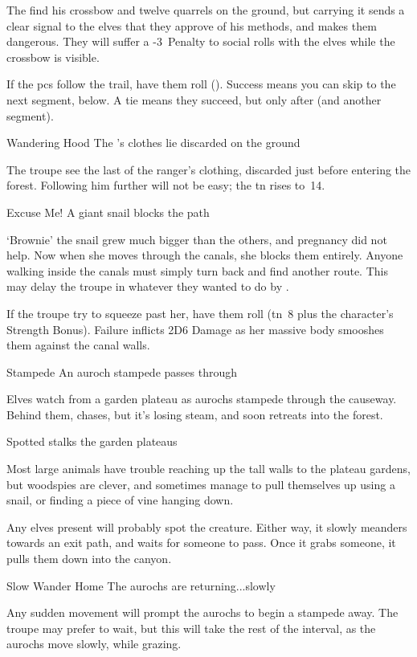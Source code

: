 The find his crossbow and twelve quarrels on the ground, but carrying it sends a clear signal to the elves that they approve of his methods, and makes them dangerous.
They will suffer a -3~Penalty to social rolls with the elves while the crossbow is visible.

If the \glspl{pc} follow the trail, have them roll  (\tn[10]).
Success means you can skip to the next \gls{segment}, below.
A tie means they succeed, but only after  (and another \gls{segment}).

{Wandering Hood}%
{The 's clothes lie discarded on the ground}%

The troupe see the last of the ranger's clothing, discarded just before entering the forest.
Following him further will not be easy; the \gls{tn} rises to~14.


{Excuse Me!}%
{A giant snail blocks the path}%

`Brownie' the snail grew much bigger than the others, and pregnancy did not help.
Now when she moves through the canals, she blocks them entirely.
Anyone walking inside the canals must simply turn back and find another route.
This may delay the troupe in whatever they wanted to do by .

If the troupe try to squeeze past her, have them roll  (\gls{tn}~8 plus the character's Strength Bonus).
Failure inflicts 2D6 Damage as her massive body smooshes them against the canal walls.

{Stampede}%
{An auroch stampede passes through}%

Elves watch from a garden plateau as aurochs stampede through the causeway.
Behind them,  chases, but it's losing steam, and soon retreats into the forest.

{ Spotted}%
{ stalks the garden plateaus}%

Most large animals have trouble reaching up the tall walls to the plateau gardens, but woodspies are clever, and sometimes manage to pull themselves up using a snail, or finding a piece of vine hanging down.

Any elves present will probably spot the creature.
Either way, it slowly meanders towards an exit path, and waits for someone to pass.
Once it grabs someone, it pulls them down into the canyon.

{Slow Wander Home}%
{The aurochs are returning...slowly}%

Any sudden movement will prompt the aurochs to begin a stampede away.
The troupe may prefer to wait, but this will take the rest of the \gls{interval}, as the aurochs move slowly, while grazing.


